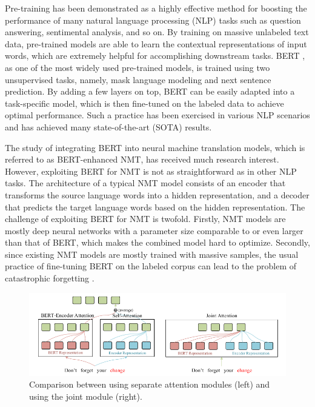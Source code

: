 \documentclass[review]{elsarticle}
\begin{document}
Pre-training has been demonstrated as a highly effective method for boosting the performance of many natural language processing (NLP) tasks such as question answering, sentimental analysis, and so on. By training on massive unlabeled text data, pre-trained models are able to learn the contextual representations of input words, which are extremely helpful for accomplishing downstream tasks. 
BERT \cite{Delvin19}, as one of the most widely used pre-trained models, is trained using two unsupervised tasks, namely, mask language modeling and next sentence prediction.
By adding a few layers on top, BERT can be easily adapted into a task-specific model, which is then fine-tuned on the labeled data to achieve optimal performance. Such a practice has been exercised in various NLP scenarios and has achieved many state-of-the-art (SOTA) results.

The study of integrating BERT into neural machine translation models, which is referred to as BERT-enhanced NMT, has received much research interest. However, exploiting BERT for NMT is not as straightforward as in other NLP tasks.
The architecture of a typical NMT model consists of an encoder that transforms the source language words into a hidden representation, and a decoder that predicts the target language words based on the hidden representation. The challenge of exploiting BERT for NMT is twofold. Firstly, NMT models are mostly deep neural networks with a parameter size comparable to or even larger than that of BERT, which makes the combined model hard to optimize. Secondly, since existing NMT models are mostly trained with massive samples, the usual practice of fine-tuning BERT on the labeled corpus can lead to the problem of catastrophic forgetting \cite{Goodfellow13, Yang20}.

\begin{figure}[!t]
    \centering
    \includegraphics[width=\textwidth]{compare}
    \caption{Comparison between using separate attention modules (left) and using the joint module (right).}
    \label{fig:compare}
\end{figure}
\end{document}
